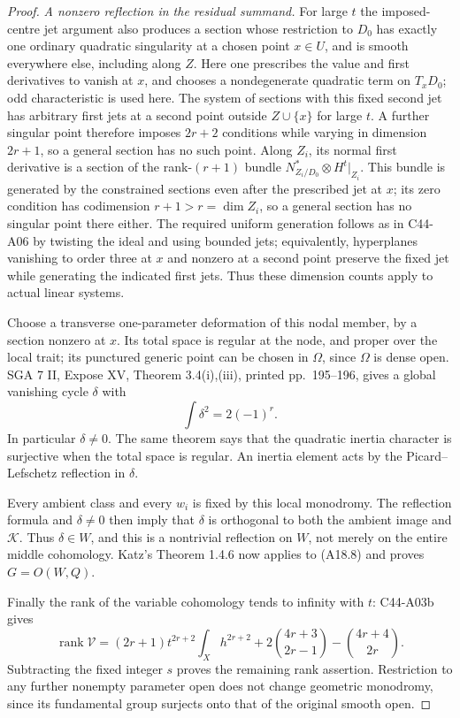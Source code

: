 \documentclass[11pt]{article}
\theoremstyle{remark}\newtheorem{remark}[theorem]{Remark}
\begin{document}
\begin{proof}
\emph{A nonzero reflection in the residual summand.}
For large $t$ the imposed-centre jet argument also produces a
section whose restriction to $D_0$ has exactly one ordinary
quadratic singularity at a chosen point $x\in U$, and is smooth
everywhere else, including along $Z$.
Here one prescribes the value and first derivatives to vanish at
$x$, and chooses a nondegenerate quadratic term on $T_xD_0$;
odd characteristic is used here. The system of sections with
this fixed second jet has arbitrary first jets at a second
point outside $Z\cup\{x\}$ for large $t$. A further singular
point therefore imposes $2r+2$ conditions while varying in
dimension $2r+1$, so a general section has no such point.
Along $Z_i$, its normal first derivative is a section of the
rank-$(r+1)$ bundle
$N^*_{Z_i/D_0}\otimes H^t|_{Z_i}$. This bundle is generated by
the constrained sections even after the prescribed jet at $x$;
its zero condition has codimension $r+1>r=\dim Z_i$, so a
general section has no singular point there either.
The required uniform generation follows as in C44-A06 by
twisting the ideal and using bounded jets; equivalently,
hyperplanes vanishing to order three at $x$ and nonzero at a
second point preserve the fixed jet while generating the
indicated first jets. Thus these dimension counts apply to
actual linear systems.

Choose a transverse one-parameter deformation of this nodal
member, by a section nonzero at $x$. Its total space is regular
at the node, and proper over the local trait; its punctured
generic point can be chosen in $\Omega$, since $\Omega$ is
dense open. SGA 7 II, Expose XV, Theorem 3.4(i),(iii), printed
pp.~195--196, gives a global vanishing cycle $\delta$ with
\[
                       \int\delta^2=2(-1)^r.                 \tag{A18.9}
\]
In particular $\delta\ne0$. The same theorem says that the
quadratic inertia character is surjective when the total space
is regular. An inertia element acts by the Picard--Lefschetz
reflection in $\delta$.

Every ambient class and every $w_i$ is fixed by this local
monodromy. The reflection formula and $\delta\ne0$ then imply
that $\delta$ is orthogonal to both the ambient image and
$\mathcal K$. Thus $\delta\in W$, and this is a nontrivial
reflection on $W$, not merely on the entire middle cohomology.
Katz's Theorem 1.4.6 now applies to (A18.8) and proves
$G=O(W,Q)$.

Finally the rank of the variable cohomology tends to infinity
with $t$: C44-A03b gives
\[
 \operatorname{rank}\mathcal V
  =(2r+1)t^{2r+2}\int_Xh^{2r+2}
       +2\binom{4r+3}{2r-1}-\binom{4r+4}{2r}.
                                                               \tag{A18.10}
\]
Subtracting the fixed integer $s$ proves the remaining rank
assertion. Restriction to any further nonempty parameter open
does not change geometric monodromy, since its fundamental
group surjects onto that of the original smooth open.
\end{proof}
\end{document}
